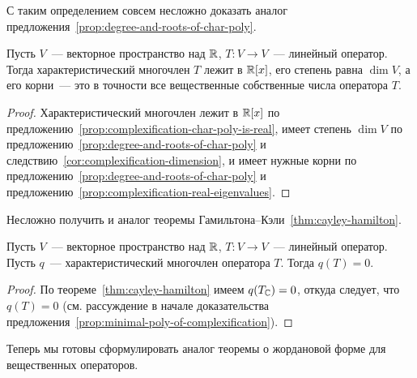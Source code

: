 С таким определением совсем несложно доказать аналог
предложения~\ref{prop:degree-and-roots-of-char-poly}.
\begin{proposition}
Пусть $V$~--- векторное пространство над $\mathbb R$, $T\colon V\to V$~--- линейный
оператор. Тогда характеристический многочлен $T$ лежит в $\mathbb R[x]$,
его степень равна $\dim V$, а его корни~--- это в точности все
вещественные собственные числа оператора $T$.
\end{proposition}
\begin{proof}
Характеристический многочлен лежит в $\mathbb R[x]$ по
предложению~\ref{prop:complexification-char-poly-is-real},
имеет степень $\dim V$ по предложению~\ref{prop:degree-and-roots-of-char-poly}
и следствию~\ref{cor:complexification-dimension},
и имеет нужные корни по предложению~\ref{prop:degree-and-roots-of-char-poly}
и предложению~\ref{prop:complexification-real-eigenvalues}.
\end{proof}
Несложно получить и аналог теоремы Гамильтона--Кэли~\ref{thm:cayley-hamilton}.
\begin{theorem}
Пусть $V$~--- векторное пространство над $\mathbb R$, $T\colon V\to V$~--- линейный
оператор. Пусть $q$~--- характеристический многочлен оператора $T$.
Тогда $q(T) = 0$.
\end{theorem}
\begin{proof}
По теореме~\ref{thm:cayley-hamilton} имеем $q(T_\mathbb C)=0$,
откуда следует, что $q(T)=0$ (см. рассуждение в начале
доказательства предложения~\ref{prop:minimal-poly-of-complexification}).
\end{proof}

Теперь мы готовы сформулировать аналог теоремы о жордановой форме
для вещественных операторов.

